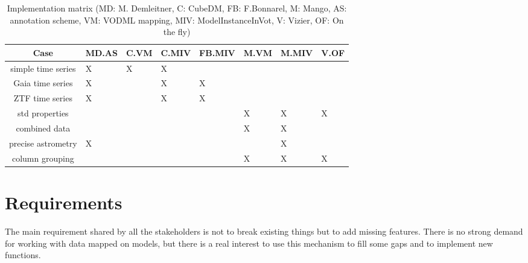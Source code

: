 \documentclass[11pt,a4paper]{ivoa}
\begin{document}
\begin{table}[!htbp]
\small
\centering
\begin{tabulary}{\linewidth}{|c|J|J|J|J|J|J|J|}       
       \hline 
            {\small \textbf{Case} }& 
           {\tiny \textbf{MD.AS} } & 
           {\tiny  \textbf{C.VM} } & 
            {\tiny \textbf{C.MIV} } & 
           {\tiny  \textbf{FB.MIV} } & 
            {\tiny \textbf{M.VM}  } & 
            {\tiny \textbf{M.MIV} } &
            {\tiny \textbf{V.OF} }\\
       \hline         \hline  
           simple time series &
           X&
           X&
           X&
            &
            &
            &
            \\
      \hline 
           Gaia time series &
           X&
           &
           X&
           X&
            &
            &
           \\
      \hline 
           ZTF time series &
           X&
           &
           X&
           X &
            &
            &
           \\
      \hline 
           std properties &
           &
           &
           &
           &
           X &
           X &
           X 
           \\
      \hline 
           combined data &
           &
           &
           &
           &
           X &
           X \\
      \hline 
           precise astrometry &
           X &
           &
           &
           &
           &
           X 
           \\
      \hline 
           column grouping &
           &
           &
           &
           &
           X &
           X &
           X \\
      \hline 
     \end{tabulary}
     \caption{Implementation matrix (MD: M. Demleitner, C: CubeDM, FB: F.Bonnarel, M: Mango, AS: annotation scheme, VM: VODML mapping, MIV: ModelInstanceInVot, V: Vizier, OF: On the fly) } 
     \label{tbl:implementation}
 \end{table}

\section{Requirements}

The main requirement shared by all the stakeholders is not to break existing things but to add missing features.
There is no strong demand for working with data mapped on models, but there is a real interest to use this mechanism 
to fill some gaps and to implement new functions.
\end{document}
